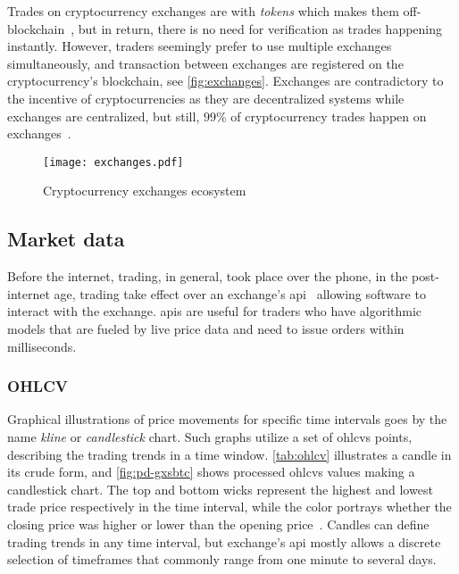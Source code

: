 Trades on cryptocurrency exchanges are with \emph{tokens} which makes them off-blockchain~\cite{exchange_off_chain}, but in return, there is no need for verification as trades happening instantly. However, traders seemingly prefer to use multiple exchanges simultaneously, and transaction between exchanges are registered on the cryptocurrency's blockchain, see \autoref{fig:exchanges}. Exchanges are contradictory to the incentive of cryptocurrencies as they are decentralized systems while exchanges are centralized, but still, $99\%$ of cryptocurrency trades happen on exchanges~\cite{coinsutra}.


\begin{figure}[ht]
    \centering
    \texttt{[image: exchanges.pdf]}
    \caption{Cryptocurrency exchanges ecosystem}
\label{fig:exchanges}
\end{figure}

\subsection{Market data}
Before the internet, trading, in general, took place over the phone, in the post-internet age, trading take effect over an exchange's \ac{api}~\cite{exchange_api} allowing software to interact with the exchange. \acp{api} are useful for traders who have algorithmic models that are fueled by live price data and need to issue orders within milliseconds.


\subsubsection{OHLCV}
Graphical illustrations of price movements for specific time intervals goes by the name \emph{kline} or \emph{candlestick} chart. Such graphs utilize a set of \acp{ohlcv} points, describing the trading trends in a time window. \autoref{tab:ohlcv} illustrates a candle in its crude form, and \autoref{fig:pd-gxsbtc} shows processed \acp{ohlcv} values making a candlestick chart. The top and bottom wicks represent the highest and lowest trade price respectively in the time interval, while the color portrays whether the closing price was higher or lower than the opening price~\cite{P&D_to_the_moon}. Candles can define trading trends in any time interval, but exchange’s \ac{api} mostly allows a discrete selection of timeframes that commonly range from one minute to several days.


